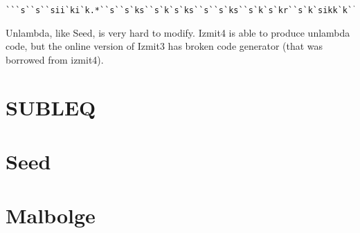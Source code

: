 \documentclass{article}
\begin{document}
\begin{verbatim}
```s``s``sii`ki`k.*``s``s`ks``s`k`s`ks``s``s`ks``s`k`s`kr``s`k`sikk`k``s`ksk
\end{verbatim}

\par Unlambda, like Seed, is very hard to modify. Izmit4 is able to produce unlambda code, but the online version of Izmit3 has broken code generator (that was borrowed from izmit4).

\section{SUBLEQ}
\section{Seed}
\section{Malbolge}
\end{document}
